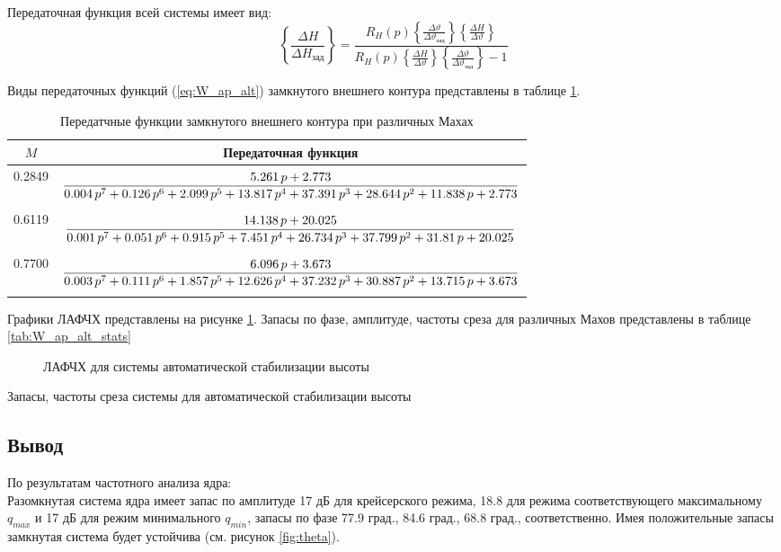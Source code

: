 Передаточная функция всей системы имеет вид: 
\begin{equation}
    \left\{ \frac{\Delta H}{\Delta H_{зад}} \right\}  = \frac{R_H(p) \left\{ \frac{\Delta \vartheta}{\Delta \vartheta_{зад}} \right\} \left\{ \frac{\Delta H }{\Delta \vartheta} \right\}}{R_H(p) \left\{ \frac{\Delta H }{\Delta \vartheta} \right\} \left\{ \frac{\Delta \vartheta}{\Delta \vartheta_{зад}} \right\}  - 1}
    \label{eq:W_ap_alt}
\end{equation}

Виды передаточных функций (\ref{eq:W_ap_alt}) замкнутого внешнего контура представлены в таблице \ref{tab:W_ap_alt}.

\begin{table}[H]
    \centering
    \caption{Передатчные функции замкнутого внешнего контура при различных Махах}
    \label{tab:W_ap_alt}
    \begin{tabular}{|c|c|}
    \hline
    $M$ & Передаточная функция\\
    \hline
    0.2849 & $\displaystyle \frac{5.261\,p+2.773}{0.004\,p^7+0.126\,p^6+2.099\,p^5+13.817\,p^4+37.391\,p^3+28.644\,p^2+11.838\,p+2.773}\addstrut{3em}$\\ 
    \hline
    0.6119 & $\displaystyle \frac{14.138\,p+20.025}{0.001\,p^7+0.051\,p^6+0.915\,p^5+7.451\,p^4+26.734\,p^3+37.799\,p^2+31.81\,p+20.025}\addstrut{3em}$\\
    \hline
    0.7700 & $\displaystyle \frac{6.096\,p+3.673}{0.003\,p^7+0.111\,p^6+1.857\,p^5+12.626\,p^4+37.232\,p^3+30.887\,p^2+13.715\,p+3.673}\addstrut{3em}$ \\
    \hline
    \end{tabular}
\end{table}

Графики ЛАФЧХ представлены на рисунке \ref{fig:W_ap_alt}. Запасы по фазе,
амплитуде, частоты среза для различных Махов представлены в таблице
\ref{tab:W_ap_alt_stats}

\begin{figure}[H]
    \centering
    
    \caption{ЛАФЧХ для системы автоматической стабилизации высоты}
    \label{fig:W_ap_alt}
\end{figure}
\begin{table}[H]
    \centering
    \caption{Запасы, частоты среза системы для автоматической стабилизации высоты}
    \label{tab:W_ap_alt_stats}
    
\end{table}

\subsection{Вывод}
По результатам частотного анализа ядра:\\
Разомкнутая система ядра имеет запас по амплитуде 17 дБ для крейсерского
режима, 18.8 для режима соответствующего максимальному $q_{max}$ и 17 дБ для
режим минимального $q_{min}$, запасы по фазе 77.9 град., 84.6 град., 68.8
град., соответственно. Имея положительные запасы замкнутая система будет устойчива (см. рисунок \ref{fig:theta}).

